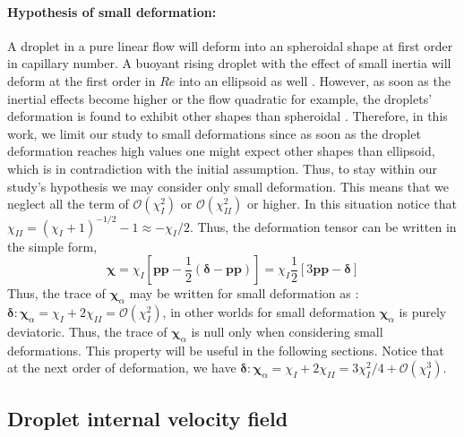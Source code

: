     
\paragraph*{Hypothesis of small deformation: }
A droplet in a pure linear flow will deform into an spheroidal shape \citet{leal2007advanced} at first order in capillary number. 
A buoyant rising droplet with the effect of small inertia will deform at the first order in $Re$ into an ellipsoid as well \citep{taylor1964deformation}.
However, as soon as the inertial effects become higher or the flow quadratic for example, the droplets' deformation is found to exhibit other shapes than spheroidal \citep{taylor1964deformation,stone1990simple}.
Therefore, in this work, we limit our study to small deformations since as soon as the droplet deformation reaches high values one might expect other shapes than ellipsoid, which is in contradiction with the initial assumption. 
Thus, to stay within our study's hypothesis we may consider only small deformation. 
This means that we neglect all the term of $\mathcal{O}(\chi_I^2)$ or $\mathcal{O}(\chi_{II}^2)$ or higher. 
In this situation notice that $\chi_{II} = (\chi_I + 1)^{-1/2} -1 \approx  - \chi_I /2$. 
Thus, the deformation tensor can be written in the simple form, 
\begin{equation}
    \bm\chi 
    = \chi_I
    \left[
        \textbf{pp} 
        - \frac{1}{2}(\bm\delta - \textbf{pp})
    \right]
    = \chi_I \frac{1}{2} \left[
        3 \textbf{pp} - \bm\delta
    \right]
    \label{eq:chi_I_small_def}
\end{equation}
Thus, the trace of $\bm\chi_\alpha$ may be written for small deformation as :  $\bm\delta:\bm\chi_\alpha  = \chi_I + 2\chi_{II} = \mathcal{O}(\chi_{I}^2)$, in other worlds for small deformation $\bm\chi_\alpha$ is purely deviatoric. 
Thus, the trace of $\bm\chi_\alpha$ is null only when considering small deformations. 
This property will be useful in the following sections.
Notice that at the next order of deformation, we have $\bm\delta:\bm\chi_\alpha  = \chi_I + 2\chi_{II} = 3 \chi_I^2 /4 +  \mathcal{O}(\chi_{I}^3)$. 

\subsection{Droplet internal velocity field}

